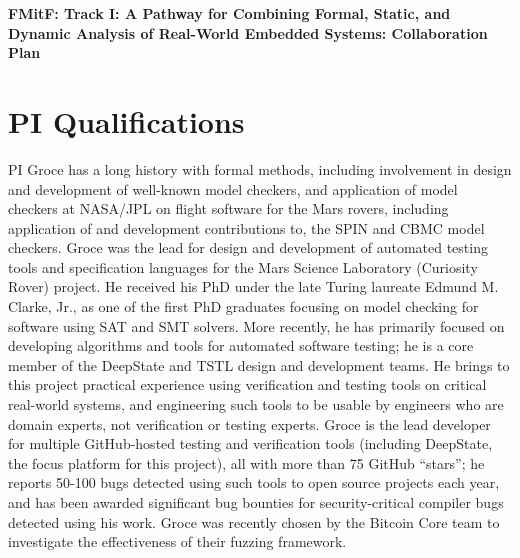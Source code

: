 \documentclass[12pt]{article}
\begin{document}

\begin{center}
{\Large\sf\textbf{FMitF: Track I: A Pathway for Combining Formal, Static, and
  Dynamic Analysis of Real-World Embedded Systems: Collaboration Plan}}
\end{center}

\section{PI Qualifications}

PI Groce has a long history with formal methods, including involvement in design and development of well-known model checkers, and application of model checkers at NASA/JPL on flight software for the Mars rovers, including application of and development contributions to, the SPIN and CBMC model checkers.  Groce was the lead for design and development of automated testing tools and specification languages for the Mars Science Laboratory (Curiosity Rover) project.  He received his PhD under the late Turing laureate Edmund M. Clarke, Jr., as one of the first PhD graduates focusing on model checking for software using SAT and SMT solvers.  More recently, he has primarily focused on developing algorithms and tools for automated software testing; he is a core member of the DeepState and TSTL design and development teams.  He brings to this project practical experience using verification and testing tools on critical real-world systems, and engineering such tools to be usable by engineers who are domain experts, not verification or testing experts.  Groce is the lead developer for multiple GitHub-hosted testing and verification tools (including DeepState, the focus platform for this project), all with more than 75 GitHub ``stars''; he reports 50-100 bugs detected using such tools to open source projects each year, and has been awarded significant bug bounties for security-critical compiler bugs detected using his work.  Groce was recently chosen by the Bitcoin Core team to investigate the effectiveness of their fuzzing framework.
\end{document}
